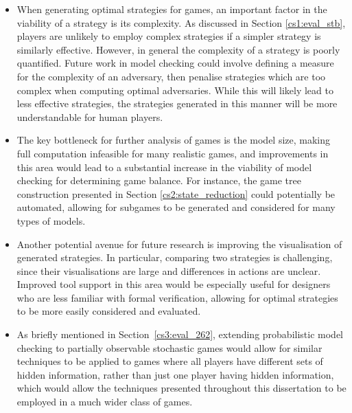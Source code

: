 \begin{itemize}
    \item When generating optimal strategies for games, an important factor in the viability of a strategy is its complexity. As discussed in Section \ref{cs1:eval_stb}, players are unlikely to employ complex strategies if a simpler strategy is similarly effective. However, in general the complexity of a strategy is poorly quantified. Future work in model checking could involve defining a measure for the complexity of an adversary, then penalise strategies which are too complex when computing optimal adversaries. While this will likely lead to less effective strategies, the strategies generated in this manner will be more understandable for human players.
    \item The key bottleneck for further analysis of games is the model size, making full computation infeasible for many realistic games, and improvements in this area would lead to a substantial increase in the viability of model checking for determining game balance. For instance, the game tree construction presented in Section \ref{cs2:state_reduction} could potentially be automated, allowing for subgames to be generated and considered for many types of models.
    \item Another potential avenue for future research is improving the visualisation of generated strategies. In particular, comparing two strategies is challenging, since their visualisations are large and differences in actions are unclear. Improved tool support in this area would be especially useful for designers who are less familiar with formal verification, allowing for optimal strategies to be more easily considered and evaluated.
    \item As briefly mentioned in Section~\ref{cs3:eval_262}, extending probabilistic model checking to partially observable stochastic games would allow for similar techniques to be applied to games where all players have different sets of hidden information, rather than just one player having hidden information, which would allow the techniques presented throughout this dissertation to be employed in a much wider class of games.
\end{itemize}